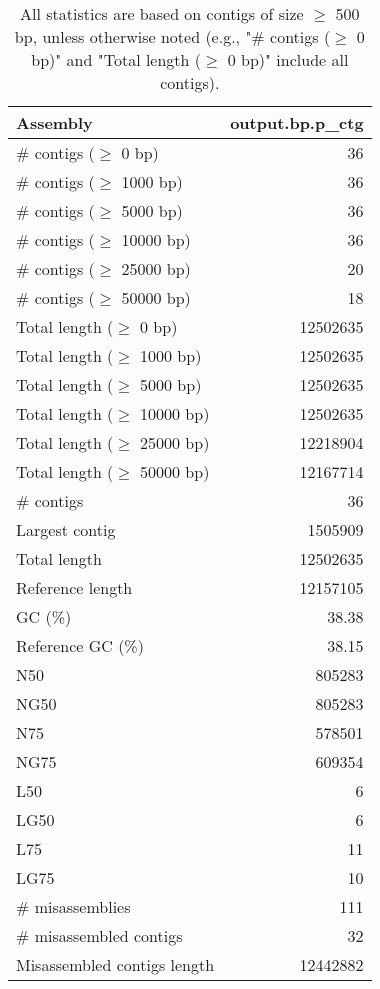 \documentclass[12pt,a4paper]{article}
\begin{document}
\begin{table}[ht]
\begin{center}
\caption{All statistics are based on contigs of size $\geq$ 500 bp, unless otherwise noted (e.g., "\# contigs ($\geq$ 0 bp)" and "Total length ($\geq$ 0 bp)" include all contigs).}
\begin{tabular}{|l*{1}{|r}|}
\hline
Assembly & output.bp.p\_ctg \\ \hline
\# contigs ($\geq$ 0 bp) & 36 \\ \hline
\# contigs ($\geq$ 1000 bp) & 36 \\ \hline
\# contigs ($\geq$ 5000 bp) & 36 \\ \hline
\# contigs ($\geq$ 10000 bp) & 36 \\ \hline
\# contigs ($\geq$ 25000 bp) & 20 \\ \hline
\# contigs ($\geq$ 50000 bp) & 18 \\ \hline
Total length ($\geq$ 0 bp) & 12502635 \\ \hline
Total length ($\geq$ 1000 bp) & 12502635 \\ \hline
Total length ($\geq$ 5000 bp) & 12502635 \\ \hline
Total length ($\geq$ 10000 bp) & 12502635 \\ \hline
Total length ($\geq$ 25000 bp) & 12218904 \\ \hline
Total length ($\geq$ 50000 bp) & 12167714 \\ \hline
\# contigs & 36 \\ \hline
Largest contig & 1505909 \\ \hline
Total length & 12502635 \\ \hline
Reference length & 12157105 \\ \hline
GC (\%) & 38.38 \\ \hline
Reference GC (\%) & 38.15 \\ \hline
N50 & 805283 \\ \hline
NG50 & 805283 \\ \hline
N75 & 578501 \\ \hline
NG75 & 609354 \\ \hline
L50 & 6 \\ \hline
LG50 & 6 \\ \hline
L75 & 11 \\ \hline
LG75 & 10 \\ \hline
\# misassemblies & 111 \\ \hline
\# misassembled contigs & 32 \\ \hline
Misassembled contigs length & 12442882 \\ \hline

\end{tabular}
\end{center}
\end{table}
\end{document}
